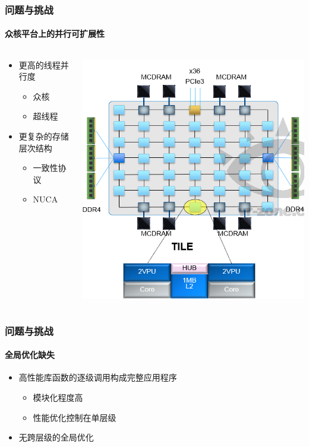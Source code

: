 \documentclass[aspectratio=169]{beamer}
\begin{document}
\begin{frame}
  \frametitle{问题与挑战}
  \framesubtitle{众核平台上的并行可扩展性}
  \begin{columns}
    \begin{column}{.4\textwidth}
      \begin{itemize}
      \item 更高的线程并行度
        \begin{itemize}
        \item 众核
        \item 超线程
        \end{itemize}
      \item 更复杂的存储层次结构
        \begin{itemize}
        \item 一致性协议
        \item NUCA
        \end{itemize}
      \end{itemize}
    \end{column}
    \begin{column}{.6\textwidth}
      \includegraphics[width=.7\textwidth]{knl1}
    \end{column}
  \end{columns}
\end{frame}

\begin{frame}
  \frametitle{问题与挑战}
  \framesubtitle{全局优化缺失}
  \begin{itemize}
  \item 高性能库函数的逐级调用构成完整应用程序
    \begin{itemize}
    \item 模块化程度高
    \item 性能优化控制在单层级
    \end{itemize}
  \item 无跨层级的全局优化
  \end{itemize}
\end{frame}
\end{document}
